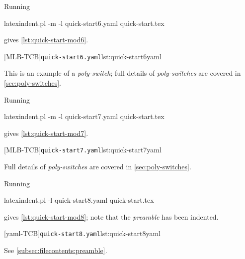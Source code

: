  \begin{example}
 Running

 \begin{commandshell}
latexindent.pl -m -l quick-start6.yaml quick-start.tex
\end{commandshell}

 gives \cref{lst:quick-start-mod6}.

 \begin{cmhtcbraster}
  [MLB-TCB]{\texttt{quick-start6.yaml}}{lst:quick-start6yaml}
 \end{cmhtcbraster}
 This is an example of a \emph{poly-switch}; full details of \emph{poly-switches} are
 covered in \cref{sec:poly-switches}.
 \end{example}

 \begin{example}
 Running

 \begin{commandshell}
latexindent.pl -m -l quick-start7.yaml quick-start.tex
\end{commandshell}

 gives \cref{lst:quick-start-mod7}.

 \begin{cmhtcbraster}
  [MLB-TCB]{\texttt{quick-start7.yaml}}{lst:quick-start7yaml}
 \end{cmhtcbraster}
 Full details of \emph{poly-switches} are covered in \cref{sec:poly-switches}.
 \end{example}

 \begin{example}
 Running

 \begin{commandshell}
latexindent.pl -l quick-start8.yaml quick-start.tex
\end{commandshell}

 gives \cref{lst:quick-start-mod8}; note that the \emph{preamble} has been indented.

 \begin{cmhtcbraster}
  [yaml-TCB]{\texttt{quick-start8.yaml}}{lst:quick-start8yaml}
 \end{cmhtcbraster}

 See \cref{subsec:filecontents:preamble}.

 \end{example}

